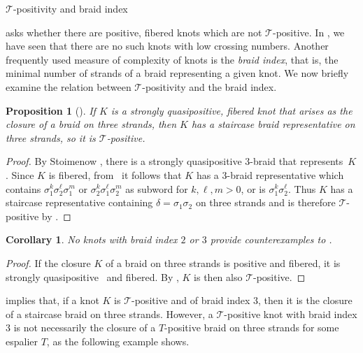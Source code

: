 \documentclass{amsart}
\makeatletter
\renewcommand\subsection{\@startsection{subsection}{2}%
  \z@{-.5\linespacing\@plus-.7\linespacing}{.5\linespacing}%
  {\normalfont\scshape}}
\theoremstyle{definition}
\theoremstyle{remark}
\theoremstyle{plain}
\newtheorem{proposition}[definition]{Proposition}
\newtheorem{corollary}[definition]{Corollary}
\newcommand{\T}{\mathcal{T}}
\makeatother
\begin{document}
\subsection{\texorpdfstring{$\T$-positivity}{T-positivity} and braid index}\label{sec:braid_index}

 asks whether there are positive, fibered knots which are not $\T$-positive. In , we have seen that there are no such knots with low crossing numbers. Another frequently used measure of complexity of knots is the \emph{braid index}, that is, the minimal number of strands of a braid representing a given knot. We now briefly examine the relation between $\T$-positivity and the braid index.

\begin{proposition}[{\cite{stoimenow:props_3-braids}}]\label{prop:braid_index_3}
    If $K$ is a strongly quasipositive, fibered knot that arises as the closure of a braid on three strands, then $K$ has a staircase braid representative on three strands, so it is $\T$-positive. 
\end{proposition}

\begin{proof}
    By Stoimenow \cite[Theorem 1.1]{stoimenow:props_3-braids}, there is a strongly quasipositive $3$-braid that represents~$K$. Since $K$ is fibered, from~\cite[Theorem~3.3, $(2) \Rightarrow (5)$]{stoimenow:props_3-braids} it follows that $K$ has a $3$-braid representative which contains $\sigma_1^k \sigma_2^\ell \sigma_1^m$ or $\sigma_2^k \sigma_1^\ell \sigma_2^m$ as subword for $k, \ell, m > 0$, or is $\sigma_1^k \sigma_2^\ell$. Thus $K$ has a staircase representative containing $\delta=\sigma_1 \sigma_2$ on three strands and is therefore $\T$-positive by .
\end{proof}

\begin{corollary}\label{cor:counterex_br_index}
    No knots with braid index $2$ or $3$ provide counterexamples to .
\end{corollary}

\begin{proof}
    If the closure $K$ of a braid on three strands is positive and fibered, it is strongly quasipositive~\cite{Rudolph_positiveLinksSQP,nakamura} and fibered. By , $K$ is then also $\T$-positive.
\end{proof}

 implies that, if a knot $K$ is $\T$-positive and of braid index $3$, then it is the closure of a staircase braid on three strands. However, a $\T$-positive knot with braid index $3$ is not necessarily the closure of a $T$-positive braid on three strands for some espalier $T$, as the following example shows. 
    
\end{document}
